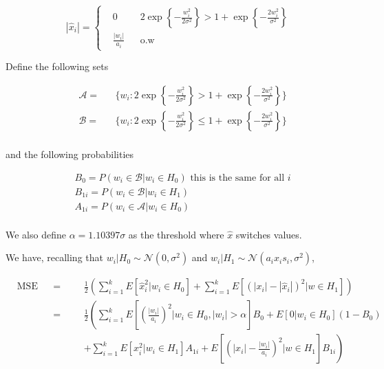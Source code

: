 \documentclass[english]{article}
\begin{document}
\begin{equation}
|\hat{x}_i|=\left\{
\begin{aligned}
&0
&&2\exp\left\{-\frac{w_i^2}{2\sigma^2}\right\} > 1 + \exp\left\{-\frac{2w_i^2}{\sigma^2}\right\}\\
& \frac{|w_i|}{a_i}
&& \text{o.w}
\end{aligned}
\right.
\end{equation}

Define the following sets

\begin{equation}
\begin{aligned}
&\mathcal{A} =
&&\{w_i:2\exp\left\{-\frac{w_i^2}{2\sigma^2}\right\} > 1 + \exp\left\{-\frac{2w_i^2}{\sigma^2}\right\}\}\\
&\mathcal{B} =
&&\{w_i:2\exp\left\{-\frac{w_i^2}{2\sigma^2}\right\} \leq 1 + \exp\left\{-\frac{2w_i^2}{\sigma^2}\right\}\}\\
\end{aligned}
\end{equation}

and the following probabilities

\begin{equation}
\begin{aligned}
&B_0=P(w_i\in \mathcal{B}|w_i\in H_0) \text{ this is the same for all } i\\
&B_{1i} = P(w_i\in \mathcal{B}|w_i\in H_1)\\
&A_{1i} = P(w_i\in \mathcal{A}|w_i\in H_0)\\
\end{aligned}
\end{equation}

We also define $\alpha = 1.10397\sigma$ as the threshold where $\hat{x}$ switches values.

We have, recalling that $w_i|H_0\sim\mathcal{N}(0,\sigma^2)$ and $w_i|H_1\sim\mathcal{N}(a_ix_is_i,\sigma^2)$,

\begin{equation}
\begin{aligned}
&\text{MSE}
&&=
&&&\frac{1}{2}\left(\sum_{i=1}^kE[\hat{x}_i^2|w_i\in H_0] + \sum_{i=1}^kE[\left(|x_i|-|\hat{x}_i|\right)^2| w\in H_1]\right)\\
&&&=
&&&\frac{1}{2}\left(\sum_{i=1}^kE[\left(\frac{|w_i|}{a_i}\right)^2|w_i\in H_0,|w_i|>\alpha]B_0 + E[0|w_i\in H_0](1-B_0)\right.\\
&&&&&&+\left.\sum_{i=1}^kE[x_i^2| w_i\in H_1]A_{1i}+E\left[\left(|x_i|-\frac{|w_i|}{a_i}\right)^2| w\in H_1\right]B_{1i}\right)\\
\end{aligned}
\end{equation}
\end{document}
